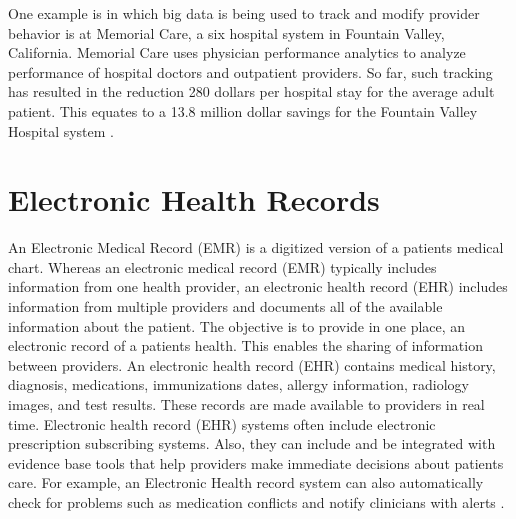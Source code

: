 \documentclass[sigconf]{acmart}
\begin{document}
One example is in which big data is being used to track and modify provider behavior is at Memorial Care, a six hospital system in Fountain Valley, California. Memorial Care uses physician performance analytics to analyze performance of hospital doctors and outpatient providers.  So far, such tracking has resulted in the reduction 280 dollars per hospital stay for the average adult patient. This equates to a 13.8 million dollar savings for the Fountain Valley Hospital system \cite{www-google-data}.
 
\section{Electronic Health Records}

An Electronic Medical Record (EMR) is a digitized version of a patients medical chart.  Whereas an electronic medical record (EMR) typically includes information from one health provider, an electronic health record (EHR) includes information from multiple providers and documents all of the available information about the patient.  The objective is to provide in one place, an electronic record of a patients health. This enables the sharing of information between providers. An electronic health record (EHR) contains medical history, diagnosis, medications, immunizations dates, allergy information, radiology images, and test results. These records are made available to providers in real time.  Electronic health record (EHR) systems often include electronic prescription subscribing systems. Also, they can include and be integrated with evidence base tools that help providers make immediate decisions about patients care. For example, an Electronic Health record system can also automatically check for problems such as medication conflicts and notify clinicians with alerts \cite{www-google-elec}.
\end{document}
